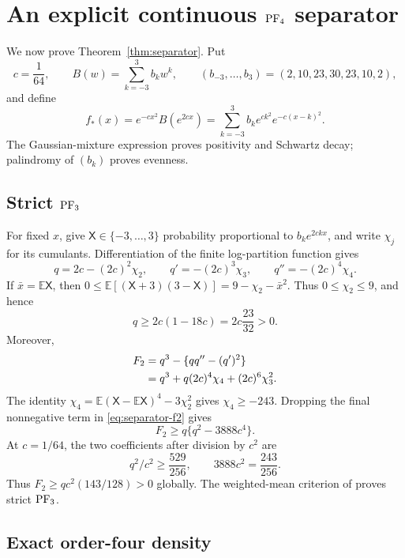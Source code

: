 \section{An explicit continuous \texorpdfstring{$\mathrm{PF}_4$}{PF4} separator}
\label{sec:separator}

We now prove Theorem~\ref{thm:separator}.  Put
\[
 c=\frac1{64},\qquad
 B(w)=\sum_{k=-3}^{3}b_kw^k,\qquad
 (b_{-3},\ldots,b_3)=(2,10,23,30,23,10,2),
\]
and define
\begin{equation}\label{eq:separator-kernel}
 f_*(x)=e^{-cx^2}B(e^{2cx})
 =\sum_{k=-3}^{3}b_ke^{ck^2}e^{-c(x-k)^2}.
\end{equation}
The Gaussian-mixture expression proves positivity and Schwartz decay;
palindromy of \((b_k)\) proves evenness.

\subsection{Strict \texorpdfstring{$\mathrm{PF}_3$}{PF3}}

For fixed \(x\), give \(\mathsf X\in\{-3,\ldots,3\}\) probability
proportional to \(b_ke^{2ckx}\), and write \(\chi_j\) for its cumulants.
Differentiation of
the finite log-partition function gives
\begin{equation}\label{eq:separator-cumulants}
 q=2c-(2c)^2\chi_2,\qquad
 q'=-(2c)^3\chi_3,\qquad
 q''=-(2c)^4\chi_4.
\end{equation}
If \(\bar x=\mathbb E\mathsf X\), then
\(0\leq\mathbb E[(\mathsf X+3)(3-\mathsf X)]=9-\chi_2-\bar x^2\).
Thus \(0\leq\chi_2\leq9\), and hence
\begin{equation}\label{eq:separator-q}
 q\geq2c(1-18c)=2c\frac{23}{32}>0.
\end{equation}
Moreover,
\begin{align}
 F_2
 &=q^3-\{qq''-(q')^2\}\notag\\
 &=q^3+q(2c)^4\chi_4+(2c)^6\chi_3^2.       \label{eq:separator-f2}
\end{align}
The identity
\(\chi_4=\mathbb E(\mathsf X-\mathbb E\mathsf X)^4-3\chi_2^2\) gives
\(\chi_4\geq-243\). Dropping the final nonnegative term in
\eqref{eq:separator-f2} gives
\[
 F_2\geq q\{q^2-3888c^4\}.
\]
At \(c=1/64\), the two coefficients after division by \(c^2\) are
\[
 q^2/c^2\geq\frac{529}{256},\qquad
 3888c^2=\frac{243}{256}.
\]
Thus \(F_2\geq q c^2(143/128)>0\) globally.  The weighted-mean criterion of
 proves strict \(\mathrm{PF}_3\).

\subsection{Exact order-four density}


